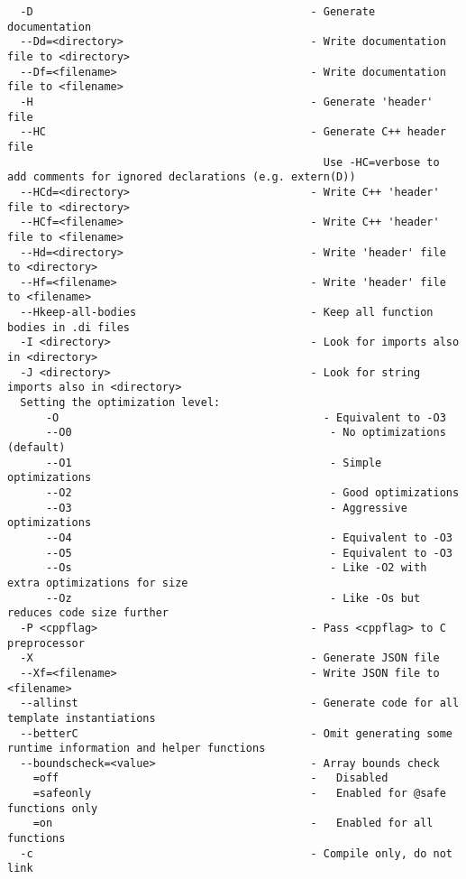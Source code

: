 \documentclass[732]{studrep}
\begin{document}
\begin{verbatim}
  -D                                           - Generate documentation
  --Dd=<directory>                             - Write documentation file to <directory>
  --Df=<filename>                              - Write documentation file to <filename>
  -H                                           - Generate 'header' file
  --HC                                         - Generate C++ header file
                                                 Use -HC=verbose to add comments for ignored declarations (e.g. extern(D))
  --HCd=<directory>                            - Write C++ 'header' file to <directory>
  --HCf=<filename>                             - Write C++ 'header' file to <filename>
  --Hd=<directory>                             - Write 'header' file to <directory>
  --Hf=<filename>                              - Write 'header' file to <filename>
  --Hkeep-all-bodies                           - Keep all function bodies in .di files
  -I <directory>                               - Look for imports also in <directory>
  -J <directory>                               - Look for string imports also in <directory>
  Setting the optimization level:
      -O                                         - Equivalent to -O3
      --O0                                        - No optimizations (default)
      --O1                                        - Simple optimizations
      --O2                                        - Good optimizations
      --O3                                        - Aggressive optimizations
      --O4                                        - Equivalent to -O3
      --O5                                        - Equivalent to -O3
      --Os                                        - Like -O2 with extra optimizations for size
      --Oz                                        - Like -Os but reduces code size further
  -P <cppflag>                                 - Pass <cppflag> to C preprocessor
  -X                                           - Generate JSON file
  --Xf=<filename>                              - Write JSON file to <filename>
  --allinst                                    - Generate code for all template instantiations
  --betterC                                    - Omit generating some runtime information and helper functions
  --boundscheck=<value>                        - Array bounds check
    =off                                       -   Disabled
    =safeonly                                  -   Enabled for @safe functions only
    =on                                        -   Enabled for all functions
  -c                                           - Compile only, do not link

\end{verbatim}
\end{document}
